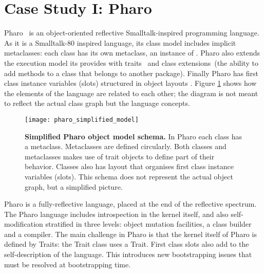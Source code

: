 \section{Case Study I: Pharo}\label{sec:bootstrap_pharo}

Pharo~\cite{Blac09a} is an object-oriented reflective Smalltalk-inspired programming language. As it is a Smalltalk-80 inspired language, its class model includes implicit metaclasses: each class has its own metaclass, an instance of . Pharo also extends the execution model its \VM provides with traits~\cite{Scha03a} and class extensions~(\ie the ability to add methods to a class that belongs to another package). Finally Pharo has first class instance variables (slots) structured in object layouts \cite{Verw11a}. Figure \ref{fig:pharo_simplified_model} shows how the elements of the language are related to each other; the diagram is not meant to reflect the actual class graph but the language concepts.

\begin{figure}[ht]
\center
\texttt{[image: pharo\_simplified\_model]}
\caption{\textbf{Simplified Pharo object model schema.} In Pharo each class has a metaclass. Metaclasses are defined circularly. Both classes and metaclasses makes use of trait objects to define part of their behavior. Classes also has layout that organises first class instance variables (slots). This schema does not represent the actual object graph, but a simplified picture.\label{fig:pharo_simplified_model}}
\end{figure}

Pharo is a fully-reflective language, placed at the end of the reflective spectrum. The Pharo language includes introspection in the kernel itself, and also self-modification stratified in three levels: object mutation facilities, a class builder and a compiler. The main challenge in Pharo is that the kernel itself of Pharo is defined by Traits: \eg the Trait class uses a Trait. First class slots also add to the self-description of the language. This introduces new bootstrapping issues that must be resolved at bootstrapping time.


